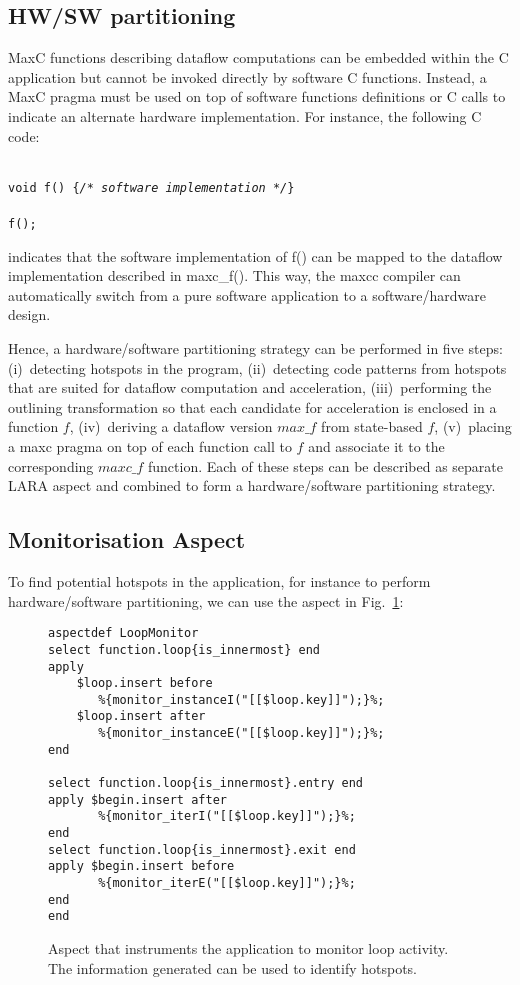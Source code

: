 \subsection{HW/SW partitioning}
\label{sect:asp_hsp}
MaxC functions describing dataflow computations can be embedded within the C application but cannot be invoked directly by software C functions. 
Instead, a MaxC pragma must be used on top of software functions definitions or C calls to indicate an alternate hardware implementation. For instance, the following C code:

\noindent\texttt{\footnotesize{} \\
void f() \{\emph{/* software implementation */}\} \\
 \\
f(); \\
}

\noindent indicates that the software implementation of f() can be mapped to the dataflow implementation described in maxc\_f(). This way, the maxcc compiler can automatically switch from 
a pure software application to a software/hardware design.

Hence, a hardware/software partitioning strategy can be performed in five steps: (i)~detecting hotspots in the program, (ii)~detecting code patterns from hotspots that are suited for dataflow computation and acceleration, (iii)~performing the outlining transformation so that each candidate for acceleration is enclosed in a function $f$, (iv)~deriving a dataflow version $max\_f$ from state-based $f$, (v)~placing a maxc pragma on top of each function call to $f$ and associate it to the corresponding $maxc\_f$ function. Each of these steps can be described as separate LARA aspect and combined to form a hardware/software partitioning strategy. 

\subsection{Monitorisation Aspect}
\label{sect:asp_mon}
To find potential hotspots in the application, for instance to perform hardware/software partitioning, we can use the aspect in Fig.~\ref{fig:hotspot}:

\lstset{style=lara}
\begin{figure}[!h]
\begin{lstlisting}
aspectdef LoopMonitor
select function.loop{is_innermost} end
apply
    $loop.insert before
       %{monitor_instanceI("[[$loop.key]]");}%;
    $loop.insert after
       %{monitor_instanceE("[[$loop.key]]");}%;
end

select function.loop{is_innermost}.entry end
apply $begin.insert after
       %{monitor_iterI("[[$loop.key]]");}%;
end
select function.loop{is_innermost}.exit end
apply $begin.insert before
       %{monitor_iterE("[[$loop.key]]");}%;
end
end
\end{lstlisting}
\caption{Aspect that instruments the application to monitor loop activity. The information generated can be used to identify hotspots.}
\label{fig:hotspot}
\end{figure}

